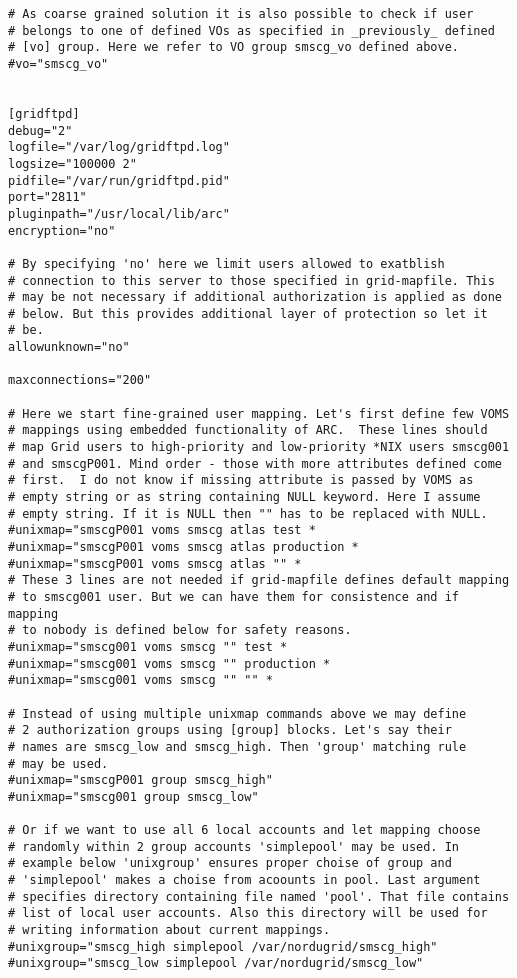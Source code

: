 \documentclass{article}
\begin{document}
\begin{verbatim}
# As coarse grained solution it is also possible to check if user 
# belongs to one of defined VOs as specified in _previously_ defined
# [vo] group. Here we refer to VO group smscg_vo defined above.
#vo="smscg_vo"


[gridftpd]
debug="2"
logfile="/var/log/gridftpd.log"
logsize="100000 2"
pidfile="/var/run/gridftpd.pid"
port="2811"
pluginpath="/usr/local/lib/arc"
encryption="no"

# By specifying 'no' here we limit users allowed to exatblish
# connection to this server to those specified in grid-mapfile. This
# may be not necessary if additional authorization is applied as done
# below. But this provides additional layer of protection so let it
# be.
allowunknown="no"

maxconnections="200"

# Here we start fine-grained user mapping. Let's first define few VOMS
# mappings using embedded functionality of ARC.  These lines should
# map Grid users to high-priority and low-priority *NIX users smscg001
# and smscgP001. Mind order - those with more attributes defined come
# first.  I do not know if missing attribute is passed by VOMS as
# empty string or as string containing NULL keyword. Here I assume
# empty string. If it is NULL then "" has to be replaced with NULL.
#unixmap="smscgP001 voms smscg atlas test *
#unixmap="smscgP001 voms smscg atlas production *
#unixmap="smscgP001 voms smscg atlas "" *
# These 3 lines are not needed if grid-mapfile defines default mapping
# to smscg001 user. But we can have them for consistence and if mapping
# to nobody is defined below for safety reasons.
#unixmap="smscg001 voms smscg "" test *
#unixmap="smscg001 voms smscg "" production *
#unixmap="smscg001 voms smscg "" "" *

# Instead of using multiple unixmap commands above we may define 
# 2 authorization groups using [group] blocks. Let's say their
# names are smscg_low and smscg_high. Then 'group' matching rule
# may be used. 
#unixmap="smscgP001 group smscg_high"
#unixmap="smscg001 group smscg_low"

# Or if we want to use all 6 local accounts and let mapping choose
# randomly within 2 group accounts 'simplepool' may be used. In
# example below 'unixgroup' ensures proper choise of group and
# 'simplepool' makes a choise from acoounts in pool. Last argument
# specifies directory containing file named 'pool'. That file contains
# list of local user accounts. Also this directory will be used for
# writing information about current mappings.
#unixgroup="smscg_high simplepool /var/nordugrid/smscg_high"
#unixgroup="smscg_low simplepool /var/nordugrid/smscg_low"


\end{verbatim}
\end{document}
